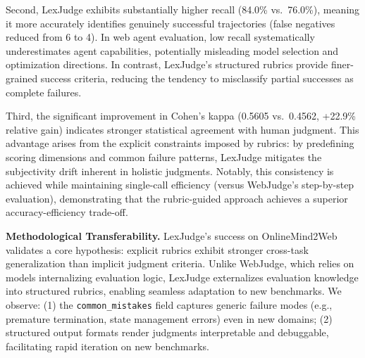 Second, LexJudge exhibits substantially higher recall (84.0\% vs.\ 76.0\%), meaning it more accurately identifies genuinely successful trajectories (false negatives reduced from 6 to 4). In web agent evaluation, low recall systematically underestimates agent capabilities, potentially misleading model selection and optimization directions. In contrast, LexJudge's structured rubrics provide finer-grained success criteria, reducing the tendency to misclassify partial successes as complete failures.

Third, the significant improvement in Cohen's kappa (0.5605 vs.\ 0.4562, +22.9\% relative gain) indicates stronger statistical agreement with human judgment. This advantage arises from the explicit constraints imposed by rubrics: by predefining scoring dimensions and common failure patterns, LexJudge mitigates the subjectivity drift inherent in holistic judgments. Notably, this consistency is achieved while maintaining single-call efficiency (versus WebJudge's step-by-step evaluation), demonstrating that the rubric-guided approach achieves a superior accuracy-efficiency trade-off.

\textbf{Methodological Transferability.}
LexJudge's success on OnlineMind2Web validates a core hypothesis: explicit rubrics exhibit stronger cross-task generalization than implicit judgment criteria. Unlike WebJudge, which relies on models internalizing evaluation logic, LexJudge externalizes evaluation knowledge into structured rubrics, enabling seamless adaptation to new benchmarks. We observe: (1) the \texttt{common\_mistakes} field captures generic failure modes (e.g., premature termination, state management errors) even in new domains; (2) structured output formats render judgments interpretable and debuggable, facilitating rapid iteration on new benchmarks.




